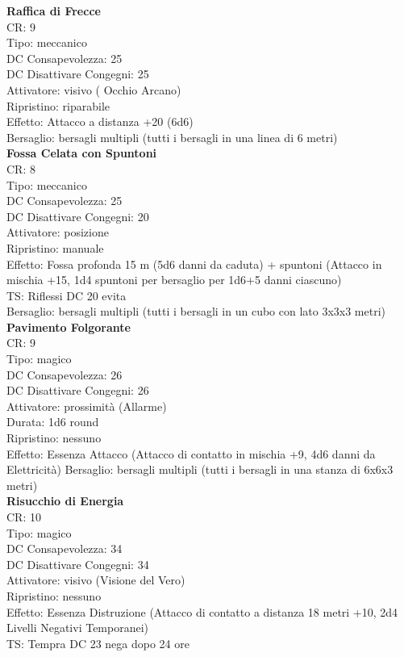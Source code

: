 \documentclass[a4paper,11pt,twoside,openany]{book}
\begin{document}
{\begin{multicols}{2}
\textbf{Raffica di Frecce}\\
CR: 9 \\
Tipo: meccanico \\
DC Consapevolezza: 25 \\
DC Disattivare Congegni: 25 \\
Attivatore: visivo ( Occhio Arcano) \\
Ripristino: riparabile \\
Effetto: Attacco a distanza +20 (6d6) \\
Bersaglio: bersagli multipli (tutti i bersagli in una linea di 6 metri)\\

\textbf{Fossa Celata con Spuntoni}\\
CR: 8 \\
Tipo: meccanico \\
DC Consapevolezza: 25 \\
DC Disattivare Congegni: 20 \\
Attivatore: posizione \\
Ripristino: manuale \\
Effetto: Fossa profonda 15 m (5d6 danni da caduta) + spuntoni (Attacco in mischia +15, 1d4 spuntoni per bersaglio per 1d6+5 danni ciascuno) \\
TS: Riflessi DC 20 evita \\
Bersaglio: bersagli multipli (tutti i bersagli in un cubo con lato 3x3x3 metri)\\

\textbf{Pavimento Folgorante}\\
CR: 9 \\
Tipo: magico \\
DC Consapevolezza: 26 \\
DC Disattivare Congegni: 26 \\
Attivatore: prossimità (Allarme) \\
Durata: 1d6 round \\
Ripristino: nessuno \\
Effetto: Essenza Attacco (Attacco di contatto in mischia +9, 4d6 danni da Elettricità) 
Bersaglio: bersagli multipli (tutti i bersagli in una stanza di 6x6x3 metri)\\

\textbf{Risucchio di Energia}\\
CR: 10 \\
Tipo: magico \\
DC Consapevolezza: 34 \\
DC Disattivare Congegni: 34 \\
Attivatore: visivo (Visione del Vero) \\
Ripristino: nessuno \\
Effetto: Essenza Distruzione (Attacco di contatto a distanza 18 metri +10, 2d4 Livelli Negativi Temporanei) \\
TS: Tempra DC 23 nega dopo 24 ore\\


\end{multicols}}
\end{document}
